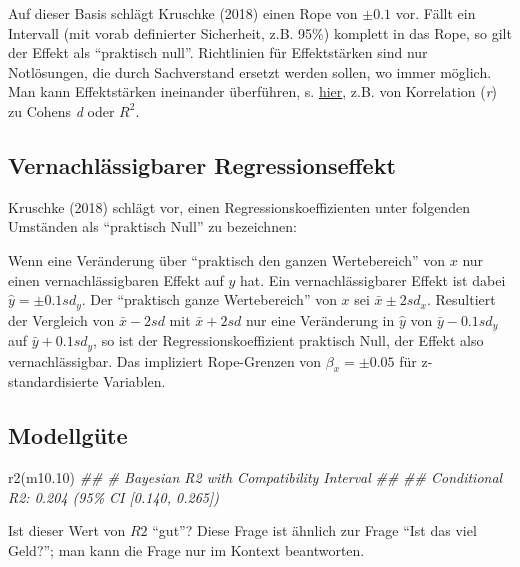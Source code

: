 \documentclass[
  a4paper,
  DIV=11]{scrreprt}
\newenvironment{Shaded}{\begin{snugshade}}{\end{snugshade}}
\newcommand{\DocumentationTok}[1]{\textcolor[rgb]{0.37,0.37,0.37}{\textit{#1}}}
\newcommand{\FloatTok}[1]{\textcolor[rgb]{0.68,0.00,0.00}{#1}}
\newcommand{\FunctionTok}[1]{\textcolor[rgb]{0.28,0.35,0.67}{#1}}
\newcommand{\NormalTok}[1]{\textcolor[rgb]{0.00,0.23,0.31}{#1}}
\theoremstyle{definition}
\theoremstyle{remark}
\begin{document}
Auf dieser Basis schlägt Kruschke (2018) einen Rope von \(\pm0.1\) vor.
Fällt ein Intervall (mit vorab definierter Sicherheit, z.B. 95\%)
komplett in das Rope, so gilt der Effekt als ``praktisch null''.
Richtlinien für Effektstärken sind nur Notlösungen, die durch
Sachverstand ersetzt werden sollen, wo immer möglich. Man kann
Effektstärken ineinander überführen, s.
\href{https://www.escal.site/}{hier}, z.B. von Korrelation (\emph{r}) zu
Cohens \emph{d} oder \(R^2\).

\hypertarget{vernachluxe4ssigbarer-regressionseffekt}{%
\subsection{Vernachlässigbarer
Regressionseffekt}\label{vernachluxe4ssigbarer-regressionseffekt}}

Kruschke (2018) schlägt vor, einen Regressionskoeffizienten unter
folgenden Umständen als ``praktisch Null'' zu bezeichnen:

Wenn eine Veränderung über ``praktisch den ganzen Wertebereich'' von
\(x\) nur einen vernachlässigbaren Effekt auf \(y\) hat. Ein
vernachlässigbarer Effekt ist dabei \(\hat{y}= \pm 0.1 sd_y\). Der
``praktisch ganze Wertebereich'' von \(x\) sei \(\bar{x} \pm 2 sd_x\).
Resultiert der Vergleich von \(\bar{x} -2 sd\) mit \(\bar{x}+2sd\) nur
eine Veränderung in \(\hat{y}\) von \(\bar{y} - 0.1sd_y\) auf
\(\bar{y} + 0.1 sd_y\), so ist der Regressionskoeffizient praktisch
Null, der Effekt also vernachlässigbar. Das impliziert Rope-Grenzen von
\(\beta_x = \pm 0.05\) für z-standardisierte Variablen.

\hypertarget{modellguxfcte}{%
\subsection{Modellgüte}\label{modellguxfcte}}

\begin{Shaded}
\begin{Highlighting}[]
\FunctionTok{r2}\NormalTok{(m10}\FloatTok{.10}\NormalTok{)}
\DocumentationTok{\#\# \# Bayesian R2 with Compatibility Interval}
\DocumentationTok{\#\# }
\DocumentationTok{\#\#   Conditional R2: 0.204 (95\% CI [0.140, 0.265])}
\end{Highlighting}
\end{Shaded}

Ist dieser Wert von \(R2\) ``gut''? Diese Frage ist ähnlich zur Frage
``Ist das viel Geld?''; man kann die Frage nur im Kontext beantworten.
\end{document}
